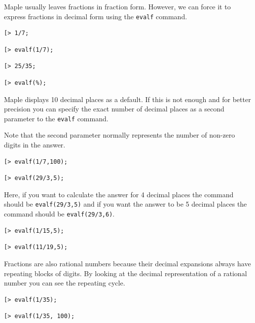 \documentclass[
]{book}
\theoremstyle{definition}
\theoremstyle{definition}
\theoremstyle{definition}
\theoremstyle{definition}
\theoremstyle{remark}
\begin{document}
Maple usually leaves fractions in fraction form. However, we can force it to express fractions in decimal form using the \texttt{evalf} command.

\begin{verbatim}
[> 1/7;
\end{verbatim}

\begin{verbatim}
[> evalf(1/7);
\end{verbatim}

\begin{verbatim}
[> 25/35;
\end{verbatim}

\begin{verbatim}
[> evalf(%);
\end{verbatim}

Maple displays 10 decimal places as a default. If this is not enough and for better precision you can specify the exact number of decimal places as a second parameter to the \texttt{evalf} command.

Note that the second parameter normally represents the number of non-zero digits in the answer.

\begin{verbatim}
[> evalf(1/7,100);
\end{verbatim}

\begin{verbatim}
[> evalf(29/3,5);
\end{verbatim}

Here, if you want to calculate the answer for 4 decimal places the command should be \texttt{evalf(29/3,5)} and if you want the answer to be 5 decimal places the command should be \texttt{evalf(29/3,6)}.

\begin{verbatim}
[> evalf(1/15,5);
\end{verbatim}

\begin{verbatim}
[> evalf(11/19,5);
\end{verbatim}

Fractions are also rational numbers because their decimal expansions always have repeating blocks of digits. By looking at the decimal representation of a rational number you can see the repeating cycle.

\begin{verbatim}
[> evalf(1/35);
\end{verbatim}

\begin{verbatim}
[> evalf(1/35, 100);
\end{verbatim}
\end{document}
